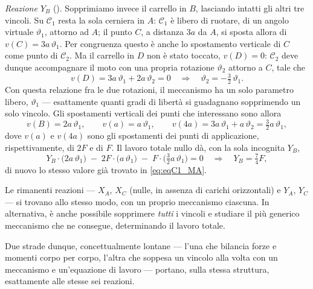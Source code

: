 \medskip

\emph{Reazione $Y_B$} (). Sopprimiamo invece il
carrello in $B$, lasciando intatti gli altri tre vincoli. Su
$\mathcal{C}_1$ resta la sola cerniera in $A$: $\mathcal{C}_1$ è libero
di ruotare, di un angolo virtuale $\vartheta_1$, attorno ad $A$; il punto
$C$, a distanza $3a$ da $A$, si sposta allora di $v(C) = 3a\,
\vartheta_1$. Per congruenza questo è anche lo spostamento verticale di
$C$ come punto di $\mathcal{C}_2$. Ma il carrello in $D$ non è stato
toccato, $v(D)=0$: $\mathcal{C}_2$ deve dunque accompagnare il moto con
una propria rotazione $\vartheta_2$ attorno a $C$, tale che
\[
v(D) = 3a\,\vartheta_1 + 2a\,\vartheta_2 = 0
\quad\Longrightarrow\quad
\vartheta_2 = -\tfrac32\,\vartheta_1 .
\]
Con questa relazione fra le due rotazioni, il meccanismo ha un solo
parametro libero, $\vartheta_1$ --- esattamente quanti gradi di libertà
si guadagnano sopprimendo un solo vincolo. Gli spostamenti verticali dei
punti che interessano sono allora
\[
v(B) = 2a\,\vartheta_1, \qquad
v(a) = a\,\vartheta_1, \qquad
v(4a) = 3a\,\vartheta_1 + a\,\vartheta_2 = \tfrac32 a\,\vartheta_1,
\]
dove $v(a)$ e $v(4a)$ sono gli spostamenti dei punti di applicazione,
rispettivamente, di $2F$ e di $F$. Il lavoro totale nullo dà, con la
sola incognita $Y_B$,
\begin{equation}\label{eq:sopp_YB}
Y_B\cdot\bigl(2a\,\vartheta_1\bigr)
\;-\; 2F\cdot\bigl(a\,\vartheta_1\bigr)
\;-\; F\cdot\bigl(\tfrac32 a\,\vartheta_1\bigr) = 0
\quad\Longrightarrow\quad Y_B = \tfrac74 F,
\end{equation}
di nuovo lo stesso valore già trovato in \eqref{eq:eqC1_MA}.





Le rimanenti reazioni --- $X_A$, $X_C$ (nulle, in assenza di carichi
orizzontali) e $Y_A$, $Y_C$ --- si trovano allo stesso modo, con un
proprio meccanismo ciascuna. In alternativa, è anche possibile sopprimere \textit{tutti}
i vincoli e studiare il più generico meccanismo che ne consegue, determinando il 
lavoro totale. 

Due strade dunque, concettualmente lontane --- l'una che bilancia forze
e momenti corpo per corpo, l'altra che soppesa un vincolo alla volta con
un meccanismo e un'equazione di lavoro --- portano, sulla stessa
struttura, esattamente alle stesse sei reazioni. 





